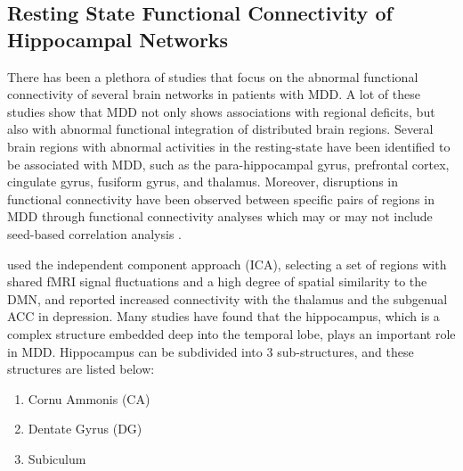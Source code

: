﻿\documentclass[12pt]{article}
\begin{document}
\subsection{Resting State Functional Connectivity of Hippocampal
Networks}

There has been a plethora of studies that focus on the abnormal
functional connectivity of several brain networks in patients with
MDD. A lot of these studies show that MDD not only shows associations
with regional deficits, but also with abnormal functional integration
of distributed brain regions. Several brain regions with abnormal
activities in the resting-state have been identified to be associated
with MDD, such as the para-hippocampal gyrus, prefrontal cortex,
cingulate gyrus, fusiform gyrus, and thalamus. Moreover, disruptions
in functional connectivity have been observed between specific pairs
of regions in MDD through functional connectivity analyses which may
or may not include seed-based correlation analysis \cite{homogeneity}.

\textcite{frontiers:rsfc} used the independent component approach
(ICA), selecting a set of regions with shared fMRI signal fluctuations
and a high degree of spatial similarity to the DMN, and reported
increased connectivity with the thalamus and the subgenual ACC in
depression. Many studies have found that the hippocampus, which is
a complex structure embedded deep into the temporal lobe, plays an
important role in MDD. Hippocampus can be subdivided into
3 sub-structures, and these structures are listed below:

\begin{enumerate}[nosep]
  \item  Cornu Ammonis (CA)
  \item  Dentate Gyrus (DG)
  \item  Subiculum
\end{enumerate}
\end{document}
